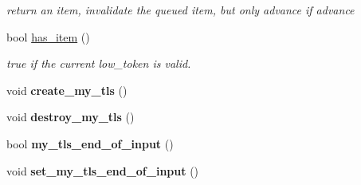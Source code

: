 \begin{DoxyCompactItemize}
\begin{DoxyCompactList}\small\item\em return an item, invalidate the queued item, but only advance if advance \end{DoxyCompactList}\item 
\hypertarget{classtbb_1_1internal_1_1input__buffer_a6e984b9bdc3290f3cee816119b0f157d}{}bool \hyperlink{classtbb_1_1internal_1_1input__buffer_a6e984b9bdc3290f3cee816119b0f157d}{has\+\_\+item} ()\label{classtbb_1_1internal_1_1input__buffer_a6e984b9bdc3290f3cee816119b0f157d}

\begin{DoxyCompactList}\small\item\em true if the current low\+\_\+token is valid. \end{DoxyCompactList}\item 
\hypertarget{classtbb_1_1internal_1_1input__buffer_ae3fc704762e63b83f192c90ffaec7d8c}{}void {\bfseries create\+\_\+my\+\_\+tls} ()\label{classtbb_1_1internal_1_1input__buffer_ae3fc704762e63b83f192c90ffaec7d8c}

\item 
\hypertarget{classtbb_1_1internal_1_1input__buffer_acc174a95da15752d84b1077aff4a10d2}{}void {\bfseries destroy\+\_\+my\+\_\+tls} ()\label{classtbb_1_1internal_1_1input__buffer_acc174a95da15752d84b1077aff4a10d2}

\item 
\hypertarget{classtbb_1_1internal_1_1input__buffer_a152a4e3a5698b53dc2571e9eac7c12d1}{}bool {\bfseries my\+\_\+tls\+\_\+end\+\_\+of\+\_\+input} ()\label{classtbb_1_1internal_1_1input__buffer_a152a4e3a5698b53dc2571e9eac7c12d1}

\item 
\hypertarget{classtbb_1_1internal_1_1input__buffer_aee54bc38bae00f10686e3532b34e9044}{}void {\bfseries set\+\_\+my\+\_\+tls\+\_\+end\+\_\+of\+\_\+input} ()\label{classtbb_1_1internal_1_1input__buffer_aee54bc38bae00f10686e3532b34e9044}

\end{DoxyCompactItemize}
